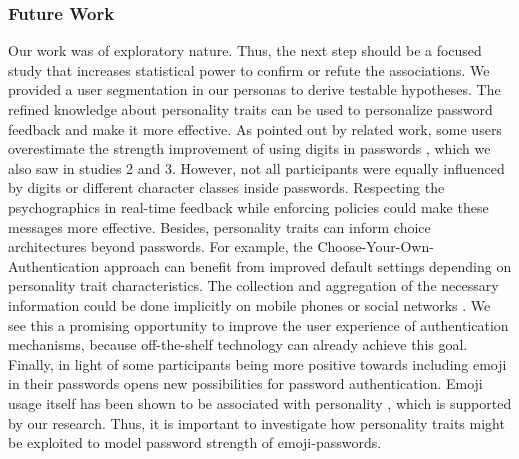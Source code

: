\subsubsection{Future Work}
Our work was of exploratory nature. Thus, the next step should be a focused study that increases statistical power to confirm or refute the associations. We provided a user segmentation in our personas to derive testable hypotheses. The refined knowledge about personality traits can be used to personalize password feedback and make it more effective. As pointed out by related work, some users overestimate the strength improvement of using digits in passwords \cite{Ur2016PerceptionsPassword}, which we also saw in studies 2 and 3. However, not all participants were equally influenced by digits or different character classes inside passwords. Respecting the psychographics in real-time feedback while enforcing policies could make these messages more effective. Besides, personality traits can inform choice architectures beyond passwords. For example, the Choose-Your-Own-Authentication approach \cite{Forget2015CYOA} can benefit from improved default settings depending on personality trait characteristics. The collection and aggregation of the necessary information could be done implicitly on mobile phones or social networks \cite{DeMontjoye2013, Stachl2017PersonalitySmartphones, Youyou2015Personality}. We see this a promising opportunity to improve the user experience of authentication mechanisms, because off-the-shelf technology can already achieve this goal. Finally, in light of some participants being more positive towards including emoji in their passwords opens new possibilities for password authentication. Emoji usage itself has been shown to be associated with personality \cite{Marengo2017EmojiPersonality}, which is supported by our research. Thus, it is important to investigate how personality traits might be exploited to model password strength of emoji-passwords. 


